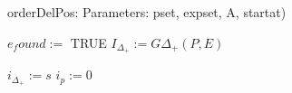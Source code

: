\documentclass[../paper.tex]{subfiles}
\begin{document}
orderDelPos:
Parameters: pset, expset, A, startat)

\begin{algorithmic}

\STATE $e_found :=$ TRUE
\STATE $I_{\Delta_{+}} := G{ \Delta_{+}}(P,E)$

\STATE $i_{\Delta_{+}} := s$ %
\STATE $i_p := 0$ %





\end{algorithmic}
\end{document}
